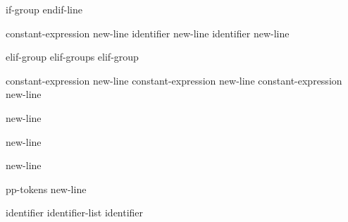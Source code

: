 \begin{bnf}
\br
    if-group   endif-line
\end{bnf}

\begin{bnf}\obeyspaces
{}\br
     constant-expression new-line \br
     identifier new-line \br
     identifier new-line 
\end{bnf}

\begin{bnf}
\br
    elif-group\br
    elif-groups elif-group
\end{bnf}

\begin{bnf}\obeyspaces
{}\br
     constant-expression new-line \br
     constant-expression new-line \br
     constant-expression new-line 
\end{bnf}

\begin{bnf}\obeyspaces
{}\br
     new-line 
\end{bnf}

\begin{bnf}\obeyspaces
{}\br
     new-line
\end{bnf}

\begin{bnf}
\br
     new-line
\end{bnf}

\begin{bnf}
\br
    pp-tokens new-line
\end{bnf}

\begin{bnf}
\br
\end{bnf}

\begin{bnf}
\br
    identifier\br
    identifier-list \terminal{,} identifier
\end{bnf}

\begin{bnf}
\br
\end{bnf}

